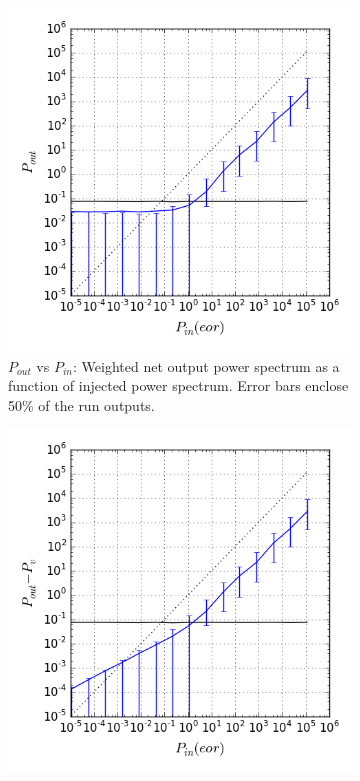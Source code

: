 \documentclass{article}
\begin{document}
\begin{figure}[bth]
\begin{center}
\begin{subfigure}{0.45\textwidth} \centering
\includegraphics[width=\textwidth]{C_loss_Nlst6_Neor6_fgscale0.001_frf_Pv_wide_PP.png}
     \caption{$P_{out}$ vs $P_{in}$:   Weighted net output power spectrum as a function of injected power spectrum.   Error bars enclose 50\% of the run outputs.}\label{fig:outvin}
   \end{subfigure}
   \begin{subfigure}{0.45\textwidth} \centering
\includegraphics[width=\textwidth]{C_loss_Nlst6_Neor6_fgscale0.001_frf_Pv_wide_sub_PP.png}

\end{subfigure}
\end{center}
\end{figure}
\end{document}
